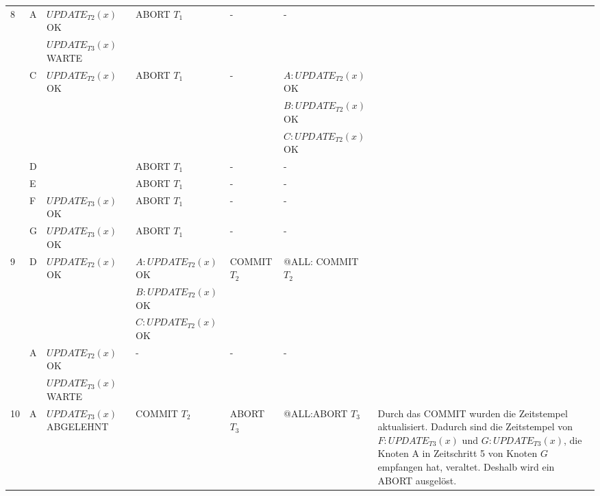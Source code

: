 \documentclass[a4paper]{article}
\begin{document}
\begin{landscape}
\begin{tabular}{| l | l | l | l | l | l | p{6cm} |}
8 & \multirow{2}{*}{A} 
			&   $UPDATE_{T2}(x)$ OK 		&   ABORT $T_1$ 	& - &	 -  &\\
			&& $UPDATE_{T3}(x)$ WARTE   &   &   &	   &  \\
\cline{2-7}
& \multirow{3}{*}{C} 
			& $UPDATE_{T2}(x)$ OK   &  ABORT $T_1$  & -  &	 $A: UPDATE_{T2}(x)$ OK  &  \\
			&& 																		  & 									 &  &	 $B: UPDATE_{T2}(x)$ OK  &  \\
			&& 																		  & 									 &  &	 $C: UPDATE_{T2}(x)$ OK  &  \\
\cline{2-7}
& D & & ABORT $T_1$& - & - &\\
\cline{2-7}
& E & & ABORT $T_1$& - & - &\\
\cline{2-7}
& F &	$UPDATE_{T3}(x)$ OK 					 & ABORT $T_1$	& - & -&\\
\cline{2-7}
& G &	$UPDATE_{T3}(x)$ OK 					 & ABORT $T_1$	& - & -&\\
\hline
\hline

9 & \multirow{2}{*}{D} 
			&   $UPDATE_{T2}(x)$ OK & $A: UPDATE_{T2}(x)$ OK 		  	& COMMIT $T_2$ &	@ALL: COMMIT $T_2$  &\\
			&& 																& $B: UPDATE_{T2}(x)$ OK      &   &	   &  \\
			&&																	& $C: UPDATE_{T2}(x)$ OK      &   &	   &  \\
\cline{2-7}
& \multirow{2}{*}{A} 
			&   $UPDATE_{T2}(x)$ OK 		&   -	& - &	 -  &\\
			&& $UPDATE_{T3}(x)$ WARTE   &   &   &	   &  \\
\hline
\hline


10 & A & $UPDATE_{T3}(x)$ ABGELEHNT   &  COMMIT $T_2$ &  ABORT $T_3$ &	 @ALL:ABORT $T_3$ &  Durch das COMMIT wurden die Zeitstempel aktualisiert. Dadurch sind die Zeitstempel von $F: UPDATE_{T3}(x)$ und $G: UPDATE_{T3}(x)$, die Knoten A in Zeitschritt 5 von Knoten $G$ empfangen hat, veraltet. Deshalb wird ein ABORT ausgelöst.\\
\hline

					
\end{tabular}
\end{landscape}
\newpage
\end{document}
